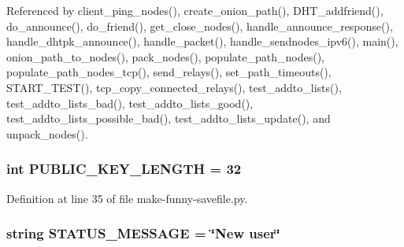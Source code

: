 Referenced by client\+\_\+ping\+\_\+nodes(), create\+\_\+onion\+\_\+path(), D\+H\+T\+\_\+addfriend(), do\+\_\+announce(), do\+\_\+friend(), get\+\_\+close\+\_\+nodes(), handle\+\_\+announce\+\_\+response(), handle\+\_\+dhtpk\+\_\+announce(), handle\+\_\+packet(), handle\+\_\+sendnodes\+\_\+ipv6(), main(), onion\+\_\+path\+\_\+to\+\_\+nodes(), pack\+\_\+nodes(), populate\+\_\+path\+\_\+nodes(), populate\+\_\+path\+\_\+nodes\+\_\+tcp(), send\+\_\+relays(), set\+\_\+path\+\_\+timeouts(), S\+T\+A\+R\+T\+\_\+\+T\+E\+S\+T(), tcp\+\_\+copy\+\_\+connected\+\_\+relays(), test\+\_\+addto\+\_\+lists(), test\+\_\+addto\+\_\+lists\+\_\+bad(), test\+\_\+addto\+\_\+lists\+\_\+good(), test\+\_\+addto\+\_\+lists\+\_\+possible\+\_\+bad(), test\+\_\+addto\+\_\+lists\+\_\+update(), and unpack\+\_\+nodes().

\hypertarget{namespacemake-funny-savefile_a500205b593194be33d2408790aabc042}{
\subsubsection[{P\+U\+B\+L\+I\+C\+\_\+\+K\+E\+Y\+\_\+\+L\+E\+N\+G\+T\+H}]{\setlength{\rightskip}{0pt plus 5cm}int P\+U\+B\+L\+I\+C\+\_\+\+K\+E\+Y\+\_\+\+L\+E\+N\+G\+T\+H = 32}}\label{namespacemake-funny-savefile_a500205b593194be33d2408790aabc042}


Definition at line 35 of file make-\/funny-\/savefile.\+py.

\hypertarget{namespacemake-funny-savefile_a870f058e594b4630f1fbdead925295b0}{
\subsubsection[{S\+T\+A\+T\+U\+S\+\_\+\+M\+E\+S\+S\+A\+G\+E}]{\setlength{\rightskip}{0pt plus 5cm}string S\+T\+A\+T\+U\+S\+\_\+\+M\+E\+S\+S\+A\+G\+E = \char`\"{}New user\char`\"{}}}\label{namespacemake-funny-savefile_a870f058e594b4630f1fbdead925295b0}


